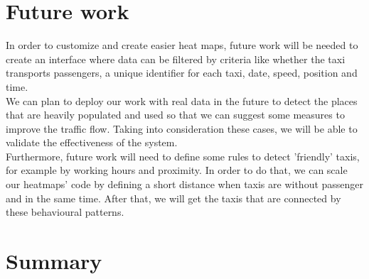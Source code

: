 \documentclass[11pt,conference,a4paper,twocolumns,romanappendices]{IEEEtran}
\begin{document}
\section{Future work}

In order to customize and create easier heat maps, future work will be needed to create an interface where data can be filtered by criteria like whether the taxi transports passengers, a unique identifier for each taxi, date, speed, position and time.  \\
We can plan to deploy our work with real data in the future to detect the places that are heavily populated and used so that we can suggest some measures to improve the traffic flow. Taking into consideration these cases, we will be able to validate the effectiveness of the system. \\
Furthermore, future work will need to define some rules to detect 'friendly' taxis, for example by working hours and proximity. In order to do that, we can scale our heatmaps' code by defining a short distance when taxis are without passenger and in the same time. After that, we will get the taxis that are connected by these behavioural patterns.

\section{Summary}

\newpage


\end{document}

